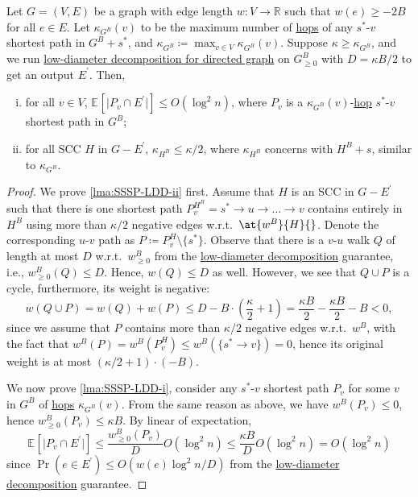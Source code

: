 \begin{lemma}\label{lma:SSSP-LDD}
	Let \(G = (V, E)\) be a graph with edge length \(w \colon V \to \mathbb{R} \) such that \(w(e) \geq -2B\) for all \(e \in E\). Let \(\kappa _{G^B}(v)\) to be the maximum number of \hyperref[not:hop]{hops} of any \(s^{\ast} \)-\(v\) shortest path in \(G^B + s^{\ast} \), and \(\kappa _{G^B}\coloneqq \max _{v \in V} \kappa _{G^B}(v)\). Suppose \(\kappa \geq \kappa _{G^B}\), and we run \hyperref[thm:directed-LDD]{low-diameter decomposition for directed graph} on \(G_{\geq 0}^B\) with \(D = \kappa B / 2\) to get an output \(E^{\prime} \). Then,
	\begin{enumerate}[(i)]
		\item\label{lma:SSSP-LDD-i} for all \(v \in V\), \(\mathbb{E}_{}[\lvert P_{v} \cap E^{\prime} \rvert ] \leq O(\log ^2 n)\), where \(P_{v}\) is a \(\kappa _{G^B}(v)\)-\hyperref[not:hop]{hop} \(s^{\ast} \)-\(v\) shortest path in \(G^B\);
		\item\label{lma:SSSP-LDD-ii} for all SCC \(H\) in \(G - E^{\prime} \), \(\kappa _{H^{B} } \leq \kappa / 2\), where \(\kappa _{H^B}\) concerns with \(H^B + s\), similar to \(\kappa _{G^B}\).
	\end{enumerate}
\end{lemma}
\begin{proof}
	We prove \autoref{lma:SSSP-LDD-ii} first. Assume that \(H\) is an SCC in \(G - E^{\prime} \) such that there is one shortest path \(P^{H^B}_{v} = s^{\ast} \to u \to \dots \to v\) contains entirely in \(H^B\) using more than \(\kappa / 2\) negative edges w.r.t.\ \(\at{w^B}{H}{} \). Denote the corresponding \(u\)-\(v\) path as \(P \coloneqq P^H_{v} \setminus \{ s^{\ast} \}\). Observe that there is a \(v\)-\(u\) walk \(Q\) of length at most \(D\) w.r.t.\ \(w_{\geq 0}^B\) from the \hyperref[thm:directed-LDD]{low-diameter decomposition} guarantee, i.e., \(w_{\geq 0}^B(Q) \leq D\). Hence, \(w(Q) \leq D\) as well. However, we see that \(Q \cup P\) is a cycle, furthermore, its weight is negative:
	\[
		w(Q \cup P)
		= w(Q) + w(P)
		\leq D - B \cdot \left( \frac{\kappa }{2} + 1\right)
		= \frac{\kappa B}{2} - \frac{\kappa B}{2} - B
		< 0,
	\]
	since we assume that \(P\) contains more than \(\kappa / 2\) negative edges w.r.t.\ \(w^B\), with the fact that \(w^B(P) = w^B(P^H_{v}) \leq w^B(\{ s^{\ast} \to v \} ) = 0\), hence its original weight is at most \((\kappa / 2 + 1) \cdot (-B)\).

	We now prove \autoref{lma:SSSP-LDD-i}, consider any \(s^{\ast} \)-\(v\) shortest path \(P_{v}\) for some \(v\) in \(G^B\) of \hyperref[not:hop]{hops} \(\kappa _{G^B}(v)\). From the same reason as above, we have \(w^B(P_{v}) \leq 0\), hence \(w^B_{\geq 0}(P_{v}) \leq \kappa B\). By linear of expectation,
	\[
		\mathbb{E}_{}[\lvert P_{v} \cap E^{\prime}  \rvert ]
		\leq \frac{w_{\geq 0}^B(P_{v})}{D} O(\log ^2 n)
		\leq \frac{\kappa B}{D} O(\log ^2 n)
		= O(\log ^2 n)
	\]
	since \(\Pr(e \in E^{\prime} ) \leq O(w(e) \log ^2 n / D)\) from the \hyperref[thm:directed-LDD]{low-diameter decomposition} guarantee.
\end{proof}

